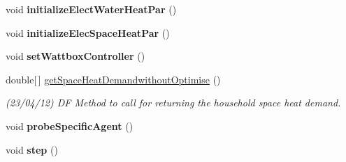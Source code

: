 \begin{DoxyCompactItemize}
\item 
\hypertarget{classuk_1_1ac_1_1dmu_1_1iesd_1_1cascade_1_1agents_1_1prosumers_1_1_household_prosumer_a0d2078fc236c26e97afc8e36fa538b56}{void {\bfseries initialize\-Elect\-Water\-Heat\-Par} ()}\label{classuk_1_1ac_1_1dmu_1_1iesd_1_1cascade_1_1agents_1_1prosumers_1_1_household_prosumer_a0d2078fc236c26e97afc8e36fa538b56}

\item 
\hypertarget{classuk_1_1ac_1_1dmu_1_1iesd_1_1cascade_1_1agents_1_1prosumers_1_1_household_prosumer_ae2caa36c2ec4a1c61f0661a38e9a6fe3}{void {\bfseries initialize\-Elec\-Space\-Heat\-Par} ()}\label{classuk_1_1ac_1_1dmu_1_1iesd_1_1cascade_1_1agents_1_1prosumers_1_1_household_prosumer_ae2caa36c2ec4a1c61f0661a38e9a6fe3}

\item 
\hypertarget{classuk_1_1ac_1_1dmu_1_1iesd_1_1cascade_1_1agents_1_1prosumers_1_1_household_prosumer_ac68df60769e547f102b0da8211362d84}{void {\bfseries set\-Wattbox\-Controller} ()}\label{classuk_1_1ac_1_1dmu_1_1iesd_1_1cascade_1_1agents_1_1prosumers_1_1_household_prosumer_ac68df60769e547f102b0da8211362d84}

\item 
double\mbox{[}$\,$\mbox{]} \hyperlink{classuk_1_1ac_1_1dmu_1_1iesd_1_1cascade_1_1agents_1_1prosumers_1_1_household_prosumer_a44a7430486dd1a2c72816bf8e2195ce2}{get\-Space\-Heat\-Demandwithout\-Optimise} ()
\begin{DoxyCompactList}\small\item\em (23/04/12) D\-F Method to call for returning the household space heat demand. \end{DoxyCompactList}\item 
\hypertarget{classuk_1_1ac_1_1dmu_1_1iesd_1_1cascade_1_1agents_1_1prosumers_1_1_household_prosumer_a3afc2f07db64335f8e20b81314e6ba1c}{void {\bfseries probe\-Specific\-Agent} ()}\label{classuk_1_1ac_1_1dmu_1_1iesd_1_1cascade_1_1agents_1_1prosumers_1_1_household_prosumer_a3afc2f07db64335f8e20b81314e6ba1c}

\item 
\hypertarget{classuk_1_1ac_1_1dmu_1_1iesd_1_1cascade_1_1agents_1_1prosumers_1_1_household_prosumer_a9f8a3d3f204c1bd9ae352dd1dbfd0fec}{void {\bfseries step} ()}\label{classuk_1_1ac_1_1dmu_1_1iesd_1_1cascade_1_1agents_1_1prosumers_1_1_household_prosumer_a9f8a3d3f204c1bd9ae352dd1dbfd0fec}


\end{DoxyCompactItemize}
